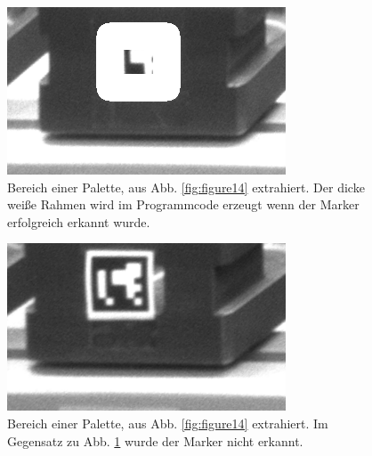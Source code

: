     \begin{figure}
        \caption[Bild aus der Lagerzelle nach der Rektifizierung und Zuschnitt auf einen Bereich einer Palette]
        {\small Bereich einer Palette, aus Abb. \ref{fig:figure14} extrahiert. Der dicke weiße Rahmen wird im Programmcode erzeugt wenn der Marker erfolgreich erkannt wurde. }\label{fig:figure16}
        \includegraphics[width = \textwidth/3]{Bilder/pallet_5.png}
        \centering
    \end{figure}

    \begin{figure}
        \caption[Bild aus der Lagerzelle nach der Rektifizierung und Zuschnitt auf einen Bereich einer Palette]
        {\small Bereich einer Palette, aus Abb. \ref{fig:figure14} extrahiert. Im Gegensatz zu Abb. \ref{fig:figure16} wurde der Marker nicht erkannt. }\label{fig:figure19}
        \includegraphics[width = \textwidth/3]{Bilder/pallet_3.png}
        \centering
    \end{figure}

